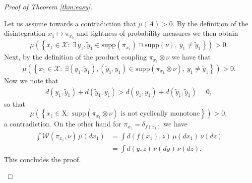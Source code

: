 \documentclass[10pt]{amsart}
\begin{document}
\begin{appendix}
\begin{proof}[Proof of Theorem \ref{thm:easy}]
\begin{enumerate}[(i)]
Let us assume towards a contradiction that $\mu(A)>0$. By the definition of the disintegration $x_1\mapsto \pi_{x_1}$ and tightness of probability measures we then obtain
\begin{align*}
\mu\left(\left\{ x_1\in \mathcal{X}:\ \exists\, y_1, \tilde{y}_1 \in \text{supp}(\pi_{x_1})\cap \text{supp}(\nu),\ y_1\neq \tilde{y}_1\right\}\right)>0.
\end{align*}
Next, by the definition of the product coupling $\pi_{x_1}\otimes \nu$ we have that
\begin{align*}
\mu( \left\{x_1\in \mathcal{X}:\ \exists (y_1,\tilde{y}_1), (\tilde{y}_1, y_1)\in \text{supp}(\pi_{x_1}\otimes \nu),\ y_1\neq \tilde{y}_1\right\})>0.
\end{align*}
Now we note that
\begin{align*}
d(y_1, \tilde{y}_1)+d(\tilde{y}_1, y_1)>d(y_1, y_1)+d(\tilde{y}_1, \tilde{y}_1)=0,
\end{align*}
so that $$\mu\left( \left\{ x_1\in \text{X}:\ \text{supp}(\pi_{x_1}\otimes \nu)\text{ is not cyclically monotone} \right\}\right)>0,$$ a contradiction. On the other hand for $\pi_{x_1}=\delta_{f(x_1)}$ we have
\begin{align*}
\int \mathcal{W}(\pi_{x_1},\nu)\,\mu(dx_1)&=\int d(f(x_1),z)\,\mu(dx_1)\,\nu(dz)\\
&=\int d(y,z)\,\nu(dy)\,\nu(dz).
\end{align*}
This concludes the proof.
\end{enumerate}
\end{proof}


\end{appendix}
\end{document}
